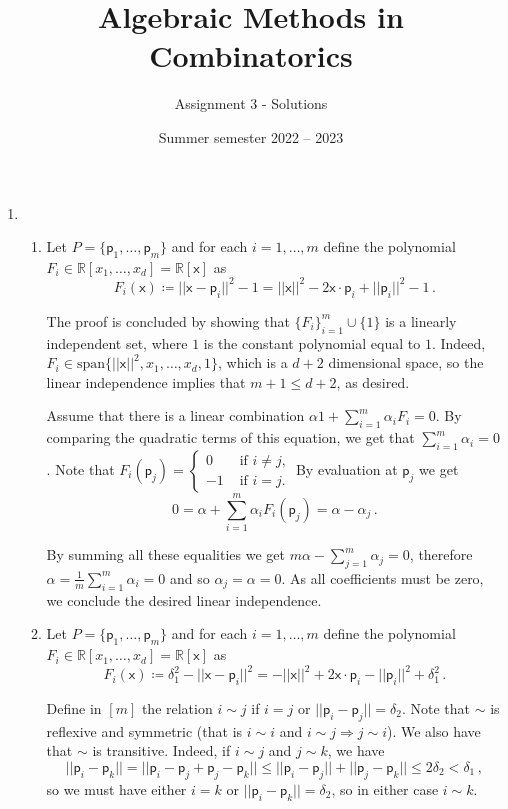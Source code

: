 \documentclass[kulak]{tplt}
\title{Algebraic Methods in Combinatorics}
\author{Assignment 3 - Solutions}
\date{Summer semester 2022 -- 2023}
\theoremstyle{definition}
\newcommand{\R}{\mathbb{R}}
\newcommand{\vx}{\mathsf{x}}
\newcommand{\vp}{\mathsf{p}}
\newcommand{\spn}{\mathrm{span}}
\begin{document}
\maketitle
\vspace{2mm}
\begin{enumerate}
\item 
\begin{enumerate}
\item
Let $P = \{\vp_1, \ldots, \vp_m \} $ and for each $i=1, \ldots, m$ define the polynomial $F_i \in \R[x_1, \ldots, x_d] = \R[\vx]$ as
$$ F_i ( \vx ) \coloneqq ||\vx - \vp_i ||^2 - 1  = ||\vx ||^2 - 2 \vx \cdot \vp_i + ||\vp_i||^2 - 1\, .$$

The proof is concluded by showing that $\{F_i\}_{i=1}^m \cup \{ 1 \}$ is a linearly independent set, where $1$ is the constant polynomial equal to $1$.
Indeed, $F_i \in \spn \{ ||\vx||^2, x_1, \ldots, x_d, 1\}$, which is a $d+2$ dimensional space, so the linear independence implies that $m+1 \leq d+2$, as desired.


Assume that there is a linear combination $\alpha 1 + \sum_{i=1}^m \alpha_i F_i = 0 $.
By comparing the quadratic terms of this equation, we get that $\sum_{i=1}^m \alpha_i = 0$.
Note that $F_i(\vp_j) = \begin{cases} 0& \text{ if $i\neq j$,} \\ -1& \text{ if $i = j$.}\end{cases}$
By evaluation at $\vp_j $ we get 
$$ 0 = \alpha + \sum_{i=1}^m \alpha_i F_i(\vp_j) = \alpha - \alpha_j\, . $$

By summing all these equalities we get $m \alpha - \sum_{j=1}^m \alpha_j = 0$, therefore $\alpha =\frac{1}{m} \sum_{i=1}^m \alpha_i = 0$ and so $\alpha_j = \alpha = 0$.
As all coefficients must be zero, we conclude the desired linear independence.

\item 
Let $P = \{\vp_1, \ldots, \vp_m \} $ and for each $i=1, \ldots, m$ define the polynomial $F_i \in \R[x_1, \ldots, x_d] = \R[\vx]$ as
$$ F_i ( \vx ) \coloneqq \delta_1^2 - ||\vx - \vp_i ||^2  = - ||\vx ||^2 + 2 \vx \cdot \vp_i - ||\vp_i||^2 + \delta_1^2\, .$$

Define in $[m]$ the relation $i\sim j $ if $i=j$ or $||\vp_i - \vp_j || = \delta_2$.
Note that $\sim $ is reflexive and symmetric (that is $i\sim i$ and $i\sim j \Rightarrow j \sim i$).
We also have that $\sim $ is transitive.
Indeed, if $i\sim j$ and $j \sim k$, we have 
$$||\vp_i - \vp_k ||  = || \vp_i - \vp_j + \vp_j - \vp_k||  \leq ||\vp_i - \vp_j || + ||\vp_j - \vp_k|| \leq 2\delta_2 < \delta_1 \, , $$
so we must have either $i=k$ or $||\vp_i - \vp_k|| = \delta_2$, so in either case $i \sim k$.


\end{enumerate}
\end{enumerate}
\end{document}
